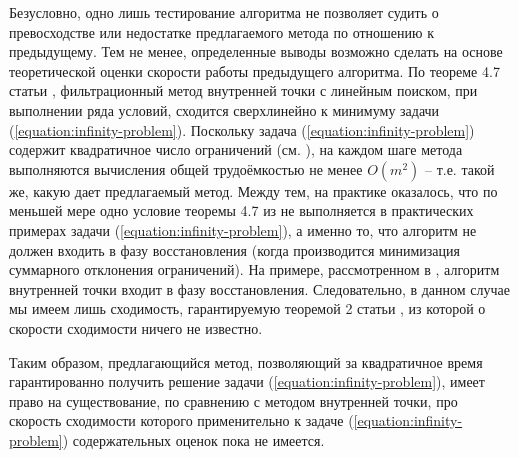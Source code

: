 \documentclass[a4paper, 10pt]{article}
\theoremstyle{definition}
\theoremstyle{plain}
\theoremstyle{plain}
\begin{document}
Безусловно, одно лишь тестирование алгоритма не позволяет судить о превосходстве
или недостатке предлагаемого метода по отношению к предыдущему. Тем не менее,
определенные выводы возможно сделать на основе теоретической оценки скорости
работы предыдущего алгоритма. По теореме 4.7 статьи \cite{WachterBiegler},
фильтрационный метод внутренней точки с линейным поиском, при выполнении ряда
условий, сходится сверхлинейно к минимуму задачи
(\ref{equation:infinity-problem}). Поскольку задача
(\ref{equation:infinity-problem}) содержит квадратичное число ограничений
(см. \cite{GardnerKiderlen,palachev}), на каждом шаге метода выполняются
вычисления общей трудоёмкостью не менее $O(m^2)$ -- т.е. такой же, какую дает
предлагаемый метод. Между тем, на практике оказалось, что по меньшей мере одно
условие теоремы 4.7 из \cite{WachterBiegler} не выполняется в практических
примерах задачи (\ref{equation:infinity-problem}), а именно то,
что алгоритм не должен входить в фазу восстановления (когда производится
минимизация суммарного отклонения ограничений). На примере, рассмотренном в
\cite{palachev}, алгоритм внутренней точки входит в фазу восстановления.
Следовательно, в данном случае мы имеем лишь сходимость, гарантируемую теоремой
2 статьи \cite{WachterBiegler2}, из которой о скорости сходимости ничего не
известно.

Таким образом, предлагающийся метод, позволяющий за квадратичное время
гарантированно получить решение задачи (\ref{equation:infinity-problem}),
имеет право на существование, по сравнению с методом внутренней точки, про
скорость сходимости которого применительно к задаче
(\ref{equation:infinity-problem}) содержательных оценок пока не имеется.
\end{document}
